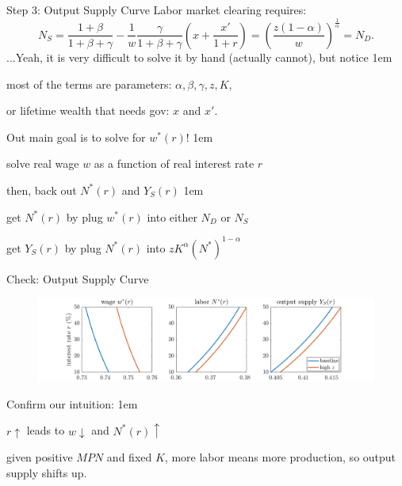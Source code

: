 \documentclass[11pt,aspectratio=43]{beamer}
\let\olditemize=\itemize
\let\endolditemize=\enditemize
\renewenvironment{itemize}{\olditemize \itemsep1em}{\endolditemize}
\theoremstyle{definition}
\begin{document}
\begin{frame}{Step 3: Output Supply Curve}
\label{slide:Step_3__Output_Supply_Curve}
    Labor market clearing requires:
    \begin{equation*}
        N_{S} = \frac{1+\beta}{1+\beta+\gamma} - \frac{1}{w} \frac{\gamma}{1+\beta+\gamma}
                \left(
                    x + \frac{x'}{1+r}
                \right)
                =
                \left(
                    \frac{z ( 1-\alpha )}{w}
                \right)^{\frac{1}{\alpha}}
                = N_{D}
    .\end{equation*}
    ...Yeah, it is very difficult to solve it by hand (actually cannot), but notice
    \begin{itemize}
        \item most of the terms are parameters: $ \alpha, \beta, \gamma, z, K $,
        \item or lifetime wealth that needs gov: $ x $ and $ x' $.
        \item Out main goal is to \alert{solve for $ w^{*}( r ) $!}
        \begin{itemize}
            \item solve real wage $ w $ as a function of real interest rate $ r $
            \item then, back out $ N^{*}( r ) $ and $ Y_{S}( r ) $
            \begin{itemize}
                \item get $ N^{*}( r ) $ by plug $ w^{*}( r ) $ into either $ N_{D} $ or $ N_{S} $
                \item get $ Y_{S}( r ) $ by plug $ N^{*}( r ) $ into $ z K^{\alpha} ( N^{*} )^{1-\alpha} $
            \end{itemize}
        \end{itemize}
    \end{itemize}
\end{frame}

\begin{frame}{Check: Output Supply Curve}
\label{slide:Check__Output_Supply_Curve}
    \begin{figure}
        \includegraphics[width=\textwidth]{./figures/OutputSupply.png}
    \end{figure}
    Confirm our intuition:
    \begin{itemize}
        \item $ r \uparrow  $ leads to $ w \downarrow  $ and $ N^{*}( r ) \uparrow  $
        \item given positive $ MPN $ and fixed $ K $, more labor means more production, so output supply shifts up.
    \end{itemize}
\end{frame}
\end{document}
